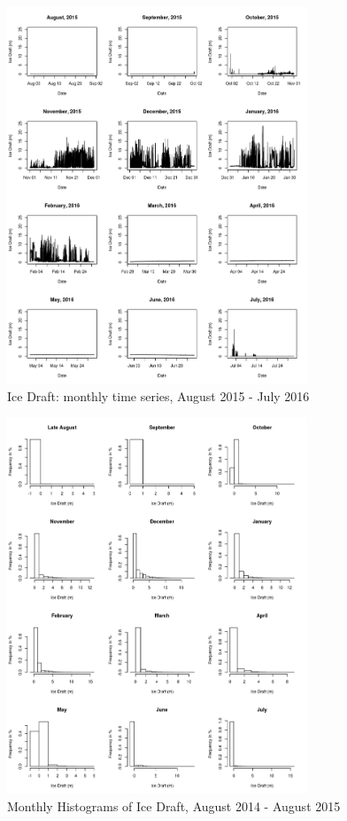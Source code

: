 \documentclass[12pt]{dforeport}
\begin{document}
\begin{figure}  
\centering
\includegraphics[width = 0.8\textwidth]{./figures/64_iceDraft_2015_2016.png}
\caption[Ice Draft, 2015-2016]{Ice Draft: monthly time series, August 2015 - July 2016}
\label{f:id_2015_2016}
\end{figure}




\begin{figure}  
\centering
\includegraphics[width = 0.8\textwidth]{./figures/65_iceHist_2014_2015.png}
\caption[Histograms of ice draft, 2014-2015]{Monthly Histograms of Ice Draft, August 2014 - August 2015}
\label{f:ih_2014_2015}
\end{figure}
\end{document}
